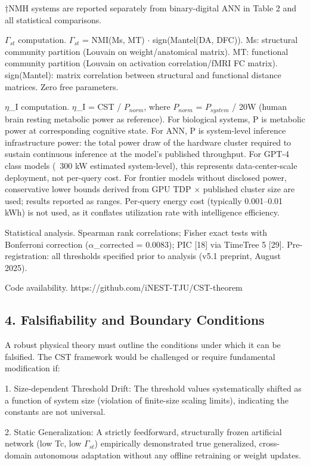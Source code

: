 \documentclass[a4paper,12pt]{article}
\begin{document}
†NMH systems are reported separately from binary-digital ANN in Table 2 and all statistical comparisons.


$\Gamma_{st}$ computation. $\Gamma_{st}$ = NMI(Ms, MT) $\cdot$ sign(Mantel(DA, DFC)). Ms: structural community partition (Louvain on weight/anatomical matrix). MT: functional community partition (Louvain on activation correlation/fMRI FC matrix). sign(Mantel): matrix correlation between structural and functional distance matrices. Zero free parameters.


$\eta$_I computation. $\eta$_I = CST / $P_{norm}$, where $P_{norm}$ = $P_{system}$ / 20W (human brain resting metabolic power as reference).
For biological systems, P is metabolic power at corresponding cognitive state.
For ANN, P is system-level inference infrastructure power: the total power draw of the hardware cluster required to sustain continuous inference at the model's published throughput.
For GPT-4 class models (~300 kW estimated system-level), this represents data-center-scale deployment, not per-query cost.
For frontier models without disclosed power, conservative lower bounds derived from GPU TDP $\times$ published cluster size are used; results reported as ranges.
Per-query energy cost (typically 0.001--0.01 kWh) is not used, as it conflates utilization rate with intelligence efficiency.


Statistical analysis. Spearman rank correlations; Fisher exact tests with Bonferroni correction ($\alpha$_corrected = 0.0083); PIC [18] via TimeTree 5 [29]. Pre-registration: all thresholds specified prior to analysis (v5.1 preprint, August 2025).


Code availability. https://github.com/iNEST-TJU/CST-theorem



\subsection{4. Falsifiability and Boundary Conditions}

A robust physical theory must outline the conditions under which it can be falsified. The CST framework would be challenged or require fundamental modification if:


1. Size-dependent Threshold Drift: The threshold values systematically shifted as a function of system size (violation of finite-size scaling limits), indicating the constants are not universal.


2. Static Generalization: A strictly feedforward, structurally frozen artificial network (low Tc, low $\Gamma_{st}$) empirically demonstrated true generalized, cross-domain autonomous adaptation without any offline retraining or weight updates.
\end{document}
